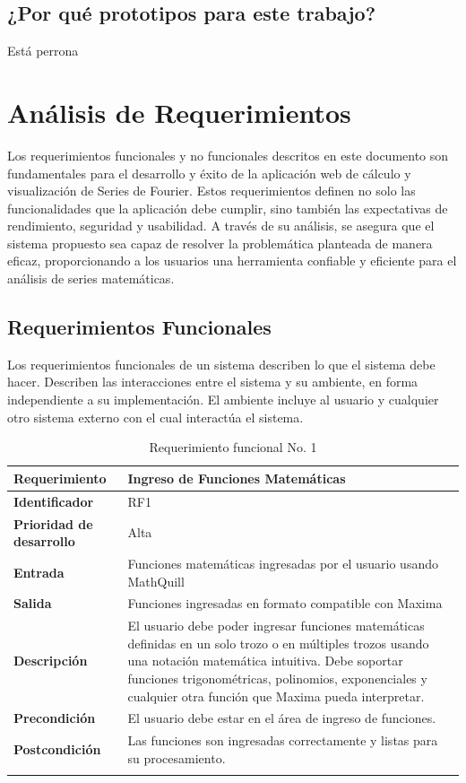 \subsection{¿Por qué prototipos para este trabajo?}
Está perrona

\section{Análisis de Requerimientos}
Los requerimientos funcionales y no funcionales descritos en este documento son fundamentales para el desarrollo y éxito de la aplicación web de cálculo y visualización de Series de Fourier. Estos requerimientos definen no solo las funcionalidades que la aplicación debe cumplir, sino también las expectativas de rendimiento, seguridad y usabilidad. A través de su análisis, se asegura que el sistema propuesto sea capaz de resolver la problemática planteada de manera eficaz, proporcionando a los usuarios una herramienta confiable y eficiente para el análisis de series matemáticas.
\subsection{Requerimientos Funcionales}
Los requerimientos funcionales de un sistema describen lo que el sistema debe hacer. Describen las interacciones entre el sistema y su ambiente, en forma independiente a su implementación. El ambiente incluye al usuario y cualquier otro sistema externo con el cual interactúa el sistema.

\begin{longtable}{|m{3.5cm}|m{9.5cm}|}
	\hline
	\rowcolor{black!75} \color{white}\textbf{Requerimiento} & \color{white}\textbf{Ingreso de Funciones Matemáticas} \\
	\hline
	
	\textbf{Identificador} & RF1 \\
	\hline
	\textbf{Prioridad de desarrollo} & Alta \\
	\hline
	\textbf{Entrada} & Funciones matemáticas ingresadas por el usuario usando MathQuill \\
	\hline
	\textbf{Salida} & Funciones ingresadas en formato compatible con Maxima \\
	\hline
	\textbf{Descripción} & El usuario debe poder ingresar funciones matemáticas definidas en un solo trozo o en múltiples trozos usando una notación matemática intuitiva. Debe soportar funciones trigonométricas, polinomios, exponenciales y cualquier otra función que Maxima pueda interpretar. \\
	\hline
	\textbf{Precondición} & El usuario debe estar en el área de ingreso de funciones. \\
	\hline
	\textbf{Postcondición} & Las funciones son ingresadas correctamente y listas para su procesamiento. \\
	\hline
	\rowcolor{white} \caption{Requerimiento funcional No. 1} \label{tabla:RF1} \\
\end{longtable}


